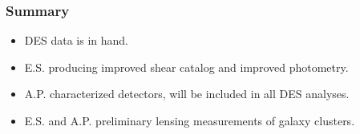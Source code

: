 \documentclass{beamer}
\begin{document}
\frame
{
    \frametitle{Summary}

    \begin{itemize}

        \item DES data is in hand.

        \item E.S. producing improved shear catalog and improved photometry.
        \item A.P. characterized detectors, will be included in all DES analyses.
            
        \item E.S. and A.P. preliminary lensing measurements of galaxy clusters.

    \end{itemize}
}
\end{document}
